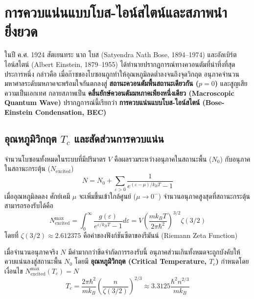 \section{การควบแน่นแบบโบส-ไอน์สไตน์และสภาพนำยิ่งยวด}

ในปี ค.ศ. 1924 สัตเยนทระ นาถ โบส (Satyendra Nath Bose, 1894--1974) และอัลเบิร์ต ไอน์สไตน์ (Albert Einstein, 1879--1955) ได้ทำนายปรากฏการณ์ทางควอนตัมที่น่าทึ่งที่สุดประการหนึ่ง กล่าวคือ เมื่อก๊าซของโบซอนถูกทำให้อุณหภูมิลดต่ำลงจนถึงจุดวิกฤต อนุภาคจำนวนมหาศาลระดับมหภาคจะพร้อมใจกันตกลงสู่ \textbf{สถานะควอนตัมพื้นสถานะเดียวกัน ($p = 0$)} และสูญเสียความเป็นเอกเทศ กลายสภาพเป็น \textbf{คลื่นยักษ์ควอนตัมมหภาคเพียงหนึ่งเดียว (Macroscopic Quantum Wave)} ปรากฏการณ์นี้เรียกว่า \textbf{การควบแน่นแบบโบส-ไอน์สไตน์ (Bose-Einstein Condensation, BEC)}

\subsection{อุณหภูมิวิกฤต $T_c$ และสัดส่วนการควบแน่น}
จำนวนโบซอนทั้งหมดในระบบที่มีปริมาตร $V$ คือผลรวมระหว่างอนุภาคในสถานะพื้น ($N_0$) กับอนุภาคในสถานะกระตุ้น ($N_{\text{excited}}$)
\begin{equation}
N = N_0 + \sum_{\varepsilon > 0} \frac{1}{e^{(\varepsilon - \mu)/k_B T} - 1}
\end{equation}
เมื่ออุณหภูมิลดลง ศักย์เคมี $\mu$ จะเพิ่มขึ้นเข้าใกล้ศูนย์ ($\mu \to 0^-$) จำนวนอนุภาคสูงสุดที่สถานะกระตุ้นสามารถรองรับได้คือ
\begin{equation}
N_{\text{excited}}^{\text{max}} = \int_0^\infty \frac{g(\varepsilon)}{e^{\varepsilon/k_B T} - 1} d\varepsilon = V \left( \frac{m k_B T}{2\pi\hbar^2} \right)^{3/2} \zeta(3/2)
\end{equation}
โดยที่ $\zeta(3/2) \approx 2.612375$ คือค่าของฟังก์ชันซีตาของรีมันน์ (Riemann Zeta Function)

เมื่อจำนวนอนุภาคจริง $N$ มีค่ามากกว่าขีดจำกัดการรองรับนี้ อนุภาคส่วนเกินทั้งหมดจะถูกบังคับให้ควบแน่นลงสู่สถานะพื้น $N_0$ โดยมี \textbf{อุณหภูมิวิกฤต (Critical Temperature, $T_c$)} กำหนดโดยเงื่อนไข $N_{\text{excited}}^{\text{max}}(T_c) = N$
\begin{equation}
T_c = \frac{2\pi\hbar^2}{m k_B} \left( \frac{n}{\zeta(3/2)} \right)^{2/3} \approx 3.3125 \frac{\hbar^2 n^{2/3}}{m k_B}
\label{eq:bec_tc_formula}
\end{equation}

